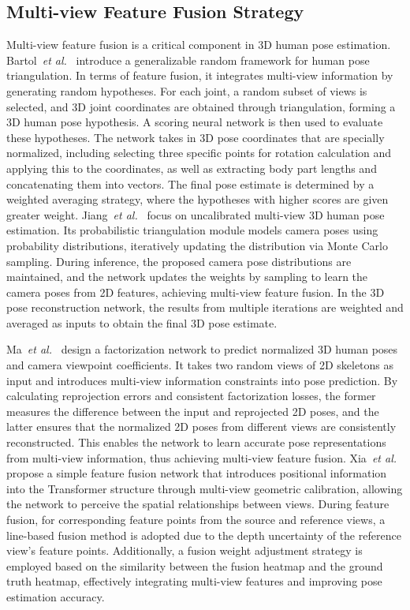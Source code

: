 \subsection{Multi-view Feature Fusion Strategy}
Multi-view feature fusion is a critical component in 3D human pose estimation. Bartol~\textit{et al.}~\cite{bartol2022generalizable} introduce a generalizable random framework for human pose triangulation. In terms of feature fusion, it integrates multi-view information by generating random hypotheses. 
For each joint, a random subset of views is selected, and 3D joint coordinates are obtained through triangulation, forming a 3D human pose hypothesis. A scoring neural network is then used to evaluate these hypotheses. 
The network takes in 3D pose coordinates that are specially normalized, including selecting three specific points for rotation calculation and applying this to the coordinates, as well as extracting body part lengths and concatenating them into vectors. 
The final pose estimate is determined by a weighted averaging strategy, where the hypotheses with higher scores are given greater weight. 
Jiang~\textit{et al.}~\cite{jiang2023probabilistic} focus on uncalibrated multi-view 3D human pose estimation. 
Its probabilistic triangulation module models camera poses using probability distributions, iteratively updating the distribution via Monte Carlo sampling. During inference, the proposed camera pose distributions are maintained, and the network updates the weights by sampling to learn the camera poses from 2D features, achieving multi-view feature fusion. 
In the 3D pose reconstruction network, the results from multiple iterations are weighted and averaged as inputs to obtain the final 3D pose estimate. 

Ma~\textit{et al.}~\cite{ma2023self} design a factorization network to predict normalized 3D human poses and camera viewpoint coefficients. 
It takes two random views of 2D skeletons as input and introduces multi-view information constraints into pose prediction. 
By calculating reprojection errors and consistent factorization losses, the former measures the difference between the input and reprojected 2D poses, and the latter ensures that the normalized 2D poses from different views are consistently reconstructed. 
This enables the network to learn accurate pose representations from multi-view information, thus achieving multi-view feature fusion. 
Xia~\textit{et al.}~\cite{xia2022vitpose} propose a simple feature fusion network that introduces positional information into the Transformer structure through multi-view geometric calibration, allowing the network to perceive the spatial relationships between views. 
During feature fusion, for corresponding feature points from the source and reference views, a line-based fusion method is adopted due to the depth uncertainty of the reference view’s feature points. Additionally, a fusion weight adjustment strategy is employed based on the similarity between the fusion heatmap and the ground truth heatmap, effectively integrating multi-view features and improving pose estimation accuracy.

